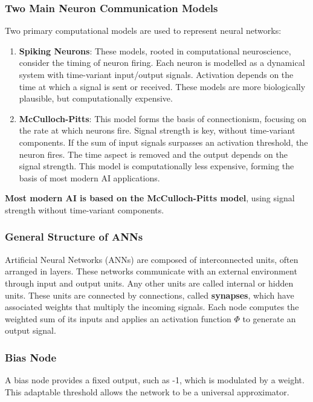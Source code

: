 \subsubsection*{Two Main Neuron Communication Models}

Two primary computational models are used to represent neural networks:
\begin{enumerate}
    \item \textbf{Spiking Neurons}: These models, rooted in computational neuroscience, consider the timing of neuron firing. Each neuron is modelled as a dynamical system with time-variant input/output signals. Activation depends on the time at which a signal is sent or received. These models are more biologically plausible, but computationally expensive.
    \item \textbf{McCulloch-Pitts}: This model forms the basis of connectionism, focusing on the rate at which neurons fire. Signal strength is key, without time-variant components. If the sum of input signals surpasses an activation threshold, the neuron fires. The time aspect is removed and the output depends on the signal strength. This model is computationally less expensive, forming the basis of most modern AI applications.
\end{enumerate}
\textbf{Most modern AI is based on the McCulloch-Pitts model}, using signal strength without time-variant components.

\subsubsection*{General Structure of ANNs}
Artificial Neural Networks (ANNs) are composed of interconnected units, often arranged in layers. These networks communicate with an external environment through input and output units. Any other units are called internal or hidden units. These units are connected by connections, called \textbf{synapses}, which have associated weights that multiply the incoming signals. Each node computes the weighted sum of its inputs and applies an activation function \(\Phi\) to generate an output signal.

\subsubsection*{Bias Node}

A bias node provides a fixed output, such as -1, which is modulated by a weight. This adaptable threshold allows the network to be a universal approximator.

